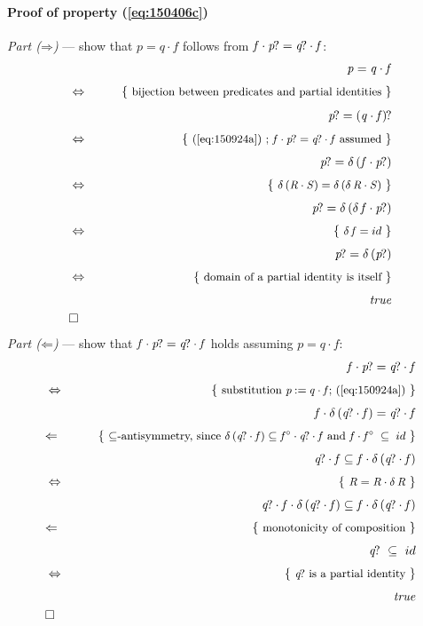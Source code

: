 \documentclass{elsarticle}
\newcommand{\Conid}[1]{\mathit{#1}}
\newcommand{\Varid}[1]{\mathit{#1}}
\def\ap#1#2{#1\,#2}
\def\comp{ \mathbin{\cdot} }
\def\conv#1{#1^\circ}
\def\implied{\mathbin\Leftarrow}
\def\just#1#2{\\ &#1& \rule{2em}{0pt} \{ \mbox{\rule[-.7em]{0pt}{1.8em} \small #2 \/} \} \nonumber\\ && }
\def\qed{\\&\Box&\nonumber}
\def\wider#1{~ #1 ~}
\def\start{&&}
\def\implies{\mathbin{\Rightarrow}}
\def\implied{\mathbin\Leftarrow}
\def\equiv{\Leftrightarrow}
\begin{document}
\paragraph{Proof of property (\ref{eq:150406c})}
\emph{Part ($\implies$)} --- show that \ensuremath{\Varid{p}\mathrel{=}\Varid{q} \comp \Varid{f}} follows from \ensuremath{\Varid{f} \comp \Varid{p}\hskip-1pt\mathit{?}\mathrel{=}\Varid{q}\hskip-1pt\mathit{?} \comp \Varid{f}}:
\begin{eqnarray*}
\start
	\ensuremath{\Varid{p}\mathrel{=}\Varid{q} \comp \Varid{f}}
%
\just\equiv{ bijection between predicates and partial identities }
%
	\ensuremath{\Varid{p}\hskip-1pt\mathit{?}\mathrel{=}(\Varid{q} \comp \Varid{f})\hskip-1pt\mathit{?}}
%
\just\equiv{ (\ref{eq:150924a}) ; \ensuremath{\Varid{f} \comp \Varid{p}\hskip-1pt\mathit{?}\mathrel{=}\Varid{q}\hskip-1pt\mathit{?} \comp \Varid{f}} assumed }
%
	\ensuremath{\Varid{p}\hskip-1pt\mathit{?}\mathrel{=}\ap{\delta}(\Varid{f} \comp \Varid{p}\hskip-1pt\mathit{?})}
%
\just\equiv{ \ensuremath{\ap{\delta}(\Conid{R} \comp \Conid{S})\mathrel{=}\ap{\delta}(\ap{\delta}\Conid{R} \comp \Conid{S})}}
%
	\ensuremath{\Varid{p}\hskip-1pt\mathit{?}\mathrel{=}\ap{\delta}(\ap{\delta}\Varid{f} \comp \Varid{p}\hskip-1pt\mathit{?})}
%
\just\equiv{ \ensuremath{\ap{\delta}\Varid{f}\mathrel{=}{id}}}
%
	\ensuremath{\Varid{p}\hskip-1pt\mathit{?}\mathrel{=}\ap{\delta}(\Varid{p}\hskip-1pt\mathit{?})}
%
\just\equiv{ domain of a partial identity is itself }
%
	\ensuremath{\Varid{true}}
\qed
\end{eqnarray*}
\emph{Part ($\implied$)} --- show that \ensuremath{\Varid{f} \comp \Varid{p}\hskip-1pt\mathit{?}\mathrel{=}\Varid{q}\hskip-1pt\mathit{?} \comp \Varid{f}} holds assuming \ensuremath{\Varid{p}\mathrel{=}\Varid{q} \comp \Varid{f}}:
\begin{eqnarray*}
\start
	\ensuremath{\Varid{f} \comp \Varid{p}\hskip-1pt\mathit{?}} = \ensuremath{\Varid{q}\hskip-1pt\mathit{?} \comp \Varid{f}}
%
\just\equiv{ substitution \ensuremath{\Varid{p}\mathbin{:=}\Varid{q} \comp \Varid{f}}; (\ref{eq:150924a}) }
%
	\ensuremath{\Varid{f} \comp \ap{\delta}(\Varid{q}\hskip-1pt\mathit{?} \comp \Varid{f})} = \ensuremath{\Varid{q}\hskip-1pt\mathit{?} \comp \Varid{f}}
%
\just\implied{ \ensuremath{ \subseteq }-antisymmetry, since \ensuremath{{\ap{\delta}(\Varid{q}\hskip-1pt\mathit{?} \comp \Varid{f})}\subseteq{\conv{\Varid{f}} \comp \Varid{q}\hskip-1pt\mathit{?} \comp \Varid{f}}} and \ensuremath{\Varid{f} \comp \conv{\Varid{f}}\; \subseteq \;{id}}}
%
	\ensuremath{{\Varid{q}\hskip-1pt\mathit{?} \comp \Varid{f}}\subseteq{\Varid{f} \comp \ap{\delta}(\Varid{q}\hskip-1pt\mathit{?} \comp \Varid{f})}}
%
\just\equiv{ \ensuremath{\Conid{R}\mathrel{=}\Conid{R} \comp \ap{\delta}\Conid{R}} }
%
	\ensuremath{{\Varid{q}\hskip-1pt\mathit{?} \comp \Varid{f} \comp \ap{\delta}(\Varid{q}\hskip-1pt\mathit{?} \comp \Varid{f})}\subseteq{\Varid{f} \comp \ap{\delta}(\Varid{q}\hskip-1pt\mathit{?} \comp \Varid{f})}}
%
\just\implied{ monotonicity of composition }
%
	\ensuremath{\Varid{q}\hskip-1pt\mathit{?}} \wider\subseteq \ensuremath{{id}}
%
\just\equiv{\ensuremath{\Varid{q}\hskip-1pt\mathit{?}} is a partial identity}
%
	\ensuremath{\Varid{true}}
\qed
\end{eqnarray*}
\end{document}

